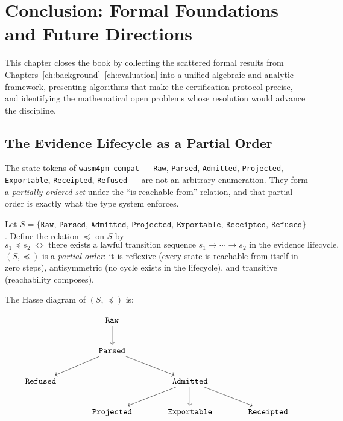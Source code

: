 \chapter{Conclusion: Formal Foundations and Future Directions}
\label{ch:conclusion}

This chapter closes the book by collecting the scattered formal results from
Chapters~\ref{ch:background}--\ref{ch:evaluation} into a unified algebraic
and analytic framework, presenting algorithms that make the certification
protocol precise, and identifying the mathematical open problems whose
resolution would advance the discipline.

\section{The Evidence Lifecycle as a Partial Order}
\label{sec:conc-poset}

The state tokens of \texttt{wasm4pm-compat} --- \texttt{Raw}, \texttt{Parsed},
\texttt{Admitted}, \texttt{Projected}, \texttt{Exportable}, \texttt{Receipted},
\texttt{Refused} --- are not an arbitrary enumeration. They form a
\emph{partially ordered set} under the ``is reachable from'' relation, and that
partial order is exactly what the type system enforces.

\begin{definition}
Let $S = \{\mathtt{Raw},\, \mathtt{Parsed},\, \mathtt{Admitted},\,
\mathtt{Projected},\, \mathtt{Exportable},\, \mathtt{Receipted},\,
\mathtt{Refused}\}$. Define the relation $\preceq$ on $S$ by
\[
  s_1 \preceq s_2 \;\Longleftrightarrow\; \text{there exists a lawful
  transition sequence } s_1 \to \cdots \to s_2 \text{ in the evidence
  lifecycle.}
\]
$(S, \preceq)$ is a \emph{partial order}: it is reflexive (every state is
reachable from itself in zero steps), antisymmetric (no cycle exists in the
lifecycle), and transitive (reachability composes).
\end{definition}

The Hasse diagram of $(S, \preceq)$ is:

\[
\begin{tikzcd}[column sep=1.2cm, row sep=0.8cm]
  & \mathtt{Raw} \arrow[d] & \\
  & \mathtt{Parsed} \arrow[dl] \arrow[dr] & \\
  \mathtt{Refused} & & \mathtt{Admitted} \arrow[dl] \arrow[d] \arrow[dr] \\
  & \mathtt{Projected} & \mathtt{Exportable} & \mathtt{Receipted}
\end{tikzcd}
\]

